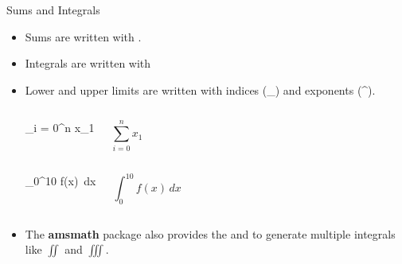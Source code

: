 \begin{frame}[fragile,c]{Sums and Integrals}
	\begin{itemize}
		\item Sums are written with .
		\item Integrals are written with 
		\item Lower and upper limits are written with indices (\_) and exponents (\textasciicircum).
			\begin{columns}
\begin{codesource}
	\sum_{i = 0}^n x_1
\end{codesource}
					\begin{equation*}
						\sum_{i = 0}^n x_1
					\end{equation*}
			\end{columns}
			\begin{columns}
				\column{.4\textwidth}
\begin{codesource}
	\int_0^{10} f(x)\, dx
\end{codesource}
				\column{.4\textwidth}
					\begin{equation*}
						\int_0^{10} f(x)\, dx
					\end{equation*}
			\end{columns}
		\item The \textbf{amsmath} package also provides the 
			and  to generate multiple integrals like $\iint$ and $\iiint$.
	\end{itemize}
\end{frame}

